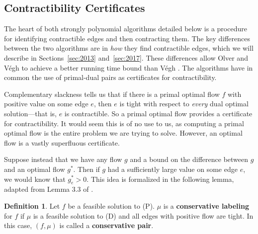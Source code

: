 \documentclass[11pt]{article}
\theoremstyle{definition}
\newtheorem{definition}{Definition}[section]
\theoremstyle{definition}
\theoremstyle{definition}
\begin{document}
	
	\subsection{Contractibility Certificates} \label{sec:cert-contract}
	The heart of both strongly polynomial algorithms detailed below is a procedure for
	identifying contractible edges and then contracting them.
	The key differences between the two algorithms are in 
	\textit{how} they find contractible edges, which
	we will describe in Sections~\ref{sec:2013} and~\ref{sec:2017}. These differences
	allow Olver and Végh \cite{Olver2017} to achieve a better running time bound than
	Végh \cite{Vegh2013}. The algorithms have in common the use of primal-dual pairs
	as certificates for contractibility.

	Complementary slackness tells us that if there is a primal optimal flow
	$f$ with positive value
	on some edge $e$, then $e$ is tight with respect to \emph{every} dual
	optimal solution---that
	is, $e$ is contractible. So a primal optimal flow provides a certificate
	for contractibility.
	It would seem this is of no use to us, as computing a primal optimal flow is the entire
	problem we are trying to solve. However,
	an optimal flow is a vastly superfluous certificate.
	
	Suppose instead that we have any flow $g$ and a bound on the difference
	between $g$ and an optimal
	flow $g^*$. Then if $g$ had a sufficiently large value on some edge $e$, we would know that
	$g^*_e > 0$. This idea is formalized in the following lemma, adapted from Lemma 3.3 of
	\cite{Olver2017}.
	
  	\begin{definition} \label{def:conservative}
  	Let $f$ be a feasible solution to (P).
	$\mu$ is a \textbf{conservative labeling} for $f$ if $\mu$ is
	a feasible solution to (D) and all edges with positive flow are tight. In this case,
	$(f, \mu)$ is called a \textbf{conservative pair}.
	\end{definition}
\end{document}
